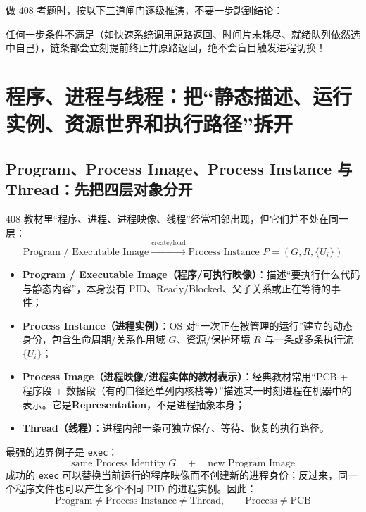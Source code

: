 \documentclass[11pt,a4paper]{ctexart}
\newcommand{\kw}[1]{\textbf{#1}}
\newcommand{\code}[1]{\texttt{#1}}
\begin{document}
\begin{exam}[做题时的三步递进闸门模型]
做 408 考题时，按以下三道闸门逐级推演，不要一步跳到结论：

\begin{center}

\end{center}

任何一步条件不满足（如快速系统调用原路返回、时间片未耗尽、就绪队列依然选中自己），链条都会立刻提前终止并原路返回，绝不会盲目触发进程切换！
\end{exam}

\section{程序、进程与线程：把“静态描述、运行实例、资源世界和执行路径”拆开}

\subsection{Program、Process Image、Process Instance 与 Thread：先把四层对象分开}

408 教材里“程序、进程、进程映像、线程”经常相邻出现，但它们并不处在同一层：
\[
\boxed{
\text{Program / Executable Image}
\xrightarrow{\text{create/load}}
\text{Process Instance }P=(G,R,\{U_i\})
}
\]
\begin{itemize}
\item \kw{Program / Executable Image（程序/可执行映像）}：描述“要执行什么代码与静态内容”，本身没有 PID、Ready/Blocked、父子关系或正在等待的事件；
\item \kw{Process Instance（进程实例）}：OS 对“一次正在被管理的运行”建立的动态身份，包含生命周期/关系作用域 $G$、资源/保护环境 $R$ 与一条或多条执行流 $\{U_i\}$；
\item \kw{Process Image（进程映像/进程实体的教材表示）}：经典教材常用“PCB + 程序段 + 数据段（有的口径还单列内核栈等）”描述某一时刻进程在机器中的表示。它是\kw{Representation}，不是进程抽象本身；
\item \kw{Thread（线程）}：进程内部一条可独立保存、等待、恢复的执行路径。
\end{itemize}

最强的边界例子是 \code{exec}：
\[
\boxed{\text{same Process Identity}\;G\quad+\quad\text{new Program Image}}
\]
成功的 \code{exec} 可以替换当前运行的程序映像而不创建新的进程身份；反过来，同一个程序文件也可以产生多个不同 PID 的进程实例。因此：
\[
\boxed{\text{Program}\neq\text{Process Instance}\neq\text{Thread},\qquad \text{Process}\neq\text{PCB}}
\]
\end{document}

